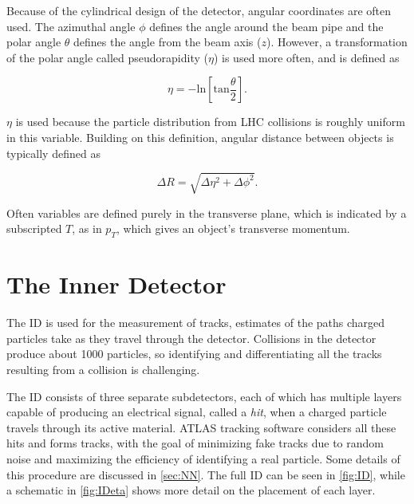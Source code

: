 Because of the cylindrical design of the detector, angular coordinates are often used. The azimuthal angle $\phi$ defines the angle around the beam pipe and the polar angle $\theta$ defines the angle from the beam axis ($z$). However, a transformation of the polar angle called pseudorapidity ($\eta$) is used more often, and is defined as 

\begin{equation}
\eta = - \mathrm{ln} [ \mathrm{tan} \frac{\theta}{2} ]. 
\end{equation}

$\eta$ is used because the particle distribution from \ac{LHC} collisions is roughly uniform in this variable. Building on this definition, angular distance between objects is typically defined as

\begin{equation}
\Delta R = \sqrt{\Delta\eta^2 + \Delta\phi^2}. 
\end{equation}

Often variables are defined purely in the transverse plane, which is indicated by a subscripted $T$, as in $p_T$, which gives an object's transverse momentum. 


\section{The Inner Detector}
\label{sec:ID}

The \acf{ID} is used for the measurement of tracks, estimates of the paths charged particles take as they travel through the detector. Collisions in the detector produce about 1000 particles, so identifying and differentiating all the tracks resulting from a collision is challenging. 

The \ac{ID} consists of three separate subdetectors, each of which has multiple layers capable of producing an electrical signal, called a \textit{hit}, when a charged particle travels through its active material. \ac{ATLAS} tracking software considers all these hits and forms tracks, with the goal of minimizing fake tracks due to random noise and maximizing the efficiency of identifying a real particle. Some details of this procedure are discussed in \autoref{sec:NN}. The full \ac{ID} can be seen in \autoref{fig:ID}, while a schematic in \autoref{fig:IDeta} shows more detail on the placement of each layer.

